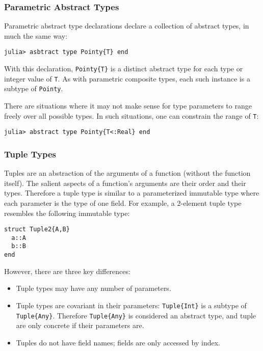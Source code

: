 \documentclass[
]{article}
\providecommand{\tightlist}{%
  \setlength{\itemsep}{0pt}\setlength{\parskip}{0pt}}
\begin{document}
\hypertarget{parametric-abstract-types}{%
\subsubsection{Parametric Abstract
Types}\label{parametric-abstract-types}}

Parametric abstract type declarations declare a collection of abstract
types, in much the same way:

\begin{verbatim}
julia> asbtract type Pointy{T} end
\end{verbatim}

With this declaration, \texttt{Pointy\{T\}} is a distinct abstract type
for each type or integer value of \texttt{T}. As with parametric
composite types, each such instance is a subtype of \texttt{Pointy}.

There are situations where it may not make sense for type parameters to
range freely over all possible types. In such situations, one can
constrain the range of \texttt{T}:

\begin{verbatim}
julia> abstract type Pointy{T<:Real} end
\end{verbatim}

\hypertarget{tuple-types}{%
\subsubsection{Tuple Types}\label{tuple-types}}

Tuples are an abstraction of the arguments of a function (without the
function itself). The salient aspects of a function's arguments are
their order and their types. Therefore a tuple type is similar to a
parameterized immutable type where each parameter is the type of one
field. For example, a 2-element tuple type resembles the following
immutable type:

\begin{verbatim}
struct Tuple2{A,B}
  a::A
  b::B
end
\end{verbatim}

However, there are three key differences:

\begin{itemize}
\tightlist
\item
  Tuple types may have any number of parameters.
\item
  Tuple types are covariant in their parameters: \texttt{Tuple\{Int\}}
  is a subtype of \texttt{Tuple\{Any\}}. Therefore \texttt{Tuple\{Any\}}
  is considered an abstract type, and tuple are only concrete if their
  parameters are.
\item
  Tuples do not have field names; fields are only accessed by index.
\end{itemize}
\end{document}
